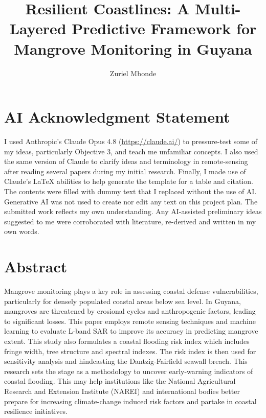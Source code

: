 \documentclass[project-plan]{report-template}
\title{Resilient Coastlines: A Multi-Layered Predictive Framework for Mangrove Monitoring in Guyana}
\author{Zuriel Mbonde}
\begin{document}
\maketitlepage  %

\section*{AI Acknowledgment Statement}
I used Anthropic's Claude Opus 4.8 (\url{https://claude.ai/}) to pressure-test some of my ideas, particularly Objective 3, and teach me unfamiliar concepts. I also used the same version of Claude to clarify ideas and terminology in remote-sensing after reading several papers during my initial research. Finally, I made use of Claude's LaTeX abilities to help generate the template for a table and citation. The contents were filled with dummy text that I replaced without the use of AI. Generative AI was not used to create nor edit any text on this project plan. The submitted work reflects my own understanding. Any AI-assisted preliminary ideas suggested to me were corroborated with literature, re-derived and written in my own words. 

\section*{Abstract}
Mangrove monitoring plays a key role in assessing coastal defense vulnerabilities, particularly for densely populated coastal areas below sea level. In Guyana, mangroves are threatened by erosional cycles and anthropogenic factors, leading to significant losses. This paper employs remote sensing techniques and machine learning to evaluate L-band SAR to improve its accuracy in predicting mangrove extent. This study also formulates a coastal flooding risk index which includes fringe width, tree structure and spectral indexes. The risk index is then used for sensitivity analysis and hindcasting the Dantzig-Fairfield seawall breach. This research sets the stage as a methodology to uncover early-warning indicators of coastal flooding. This may help institutions like the National Agricultural Research and Extension Institute (NAREI) and international bodies better prepare for increasing climate-change induced risk factors and partake in coastal resilience initiatives. 

\end{document}
